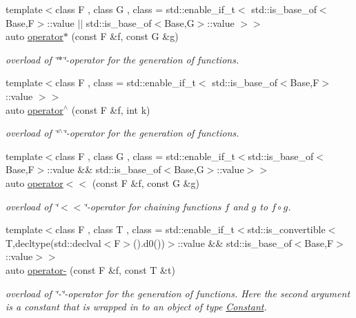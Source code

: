 \begin{DoxyCompactItemize}
{\footnotesize template$<$class F , class G , class  = std\-::enable\-\_\-if\-\_\-t$<$ std\-::is\-\_\-base\-\_\-of$<$\-Base,\-F$>$\-::value $\vert$$\vert$ std\-::is\-\_\-base\-\_\-of$<$\-Base,\-G$>$\-::value $>$$>$ }\\auto \hyperlink{namespaceFunG_a014be932d3b4eb377d8e60271e864438}{operator$\ast$} (const F \&f, const G \&g)
\begin{DoxyCompactList}\small\item\em overload of \char`\"{}$\ast$\char`\"{}-\/operator for the generation of functions. \end{DoxyCompactList}\item 
{\footnotesize template$<$class F , class  = std\-::enable\-\_\-if\-\_\-t$<$ std\-::is\-\_\-base\-\_\-of$<$\-Base,\-F$>$\-::value $>$$>$ }\\auto \hyperlink{namespaceFunG_aeb22ff63cd78cb63d81b601c656da2c1}{operator$^\wedge$} (const F \&f, int k)
\begin{DoxyCompactList}\small\item\em overload of \char`\"{}$^\wedge$\char`\"{}-\/operator for the generation of functions. \end{DoxyCompactList}\item 
{\footnotesize template$<$class F , class G , class  = std\-::enable\-\_\-if\-\_\-t$<$std\-::is\-\_\-base\-\_\-of$<$\-Base,\-F$>$\-::value \&\&                                     std\-::is\-\_\-base\-\_\-of$<$\-Base,\-G$>$\-::value$>$$>$ }\\auto \hyperlink{namespaceFunG_a56701b5e83b96d2d6cc5c482e36caa39}{operator$<$$<$} (const F \&f, const G \&g)
\begin{DoxyCompactList}\small\item\em overload of \char`\"{}$<$$<$\char`\"{}-\/operator for chaining functions $f$ and $g$ to $ f \circ g $. \end{DoxyCompactList}\item 
{\footnotesize template$<$class F , class T , class  = std\-::enable\-\_\-if\-\_\-t$<$std\-::is\-\_\-convertible$<$\-T,decltype(std\-::declval$<$\-F$>$().\-d0())$>$\-::value \&\&                                     std\-::is\-\_\-base\-\_\-of$<$\-Base,\-F$>$\-::value$>$$>$ }\\auto \hyperlink{namespaceFunG_aa0c4552dee9179fb50b57ece863d835a}{operator-\/} (const F \&f, const T \&t)
\begin{DoxyCompactList}\small\item\em overload of \char`\"{}-\/\char`\"{}-\/operator for the generation of functions. Here the second argument is a constant that is wrapped in to an object of type \hyperlink{structFunG_1_1Constant}{Constant}. \end{DoxyCompactList}\item 

\end{DoxyCompactItemize}
